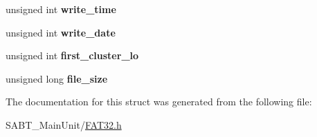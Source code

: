 \begin{DoxyCompactItemize}
\item 
\hypertarget{structdir___structure_a574ffb623d68fa48b2c90c6eead2dc12}{unsigned int {\bfseries write\-\_\-time}}\label{structdir___structure_a574ffb623d68fa48b2c90c6eead2dc12}

\item 
\hypertarget{structdir___structure_a3432b02a8e308c41d0887b5deda08f07}{unsigned int {\bfseries write\-\_\-date}}\label{structdir___structure_a3432b02a8e308c41d0887b5deda08f07}

\item 
\hypertarget{structdir___structure_a9cbf00e17f892dbda6e6fecbe964d472}{unsigned int {\bfseries first\-\_\-cluster\-\_\-lo}}\label{structdir___structure_a9cbf00e17f892dbda6e6fecbe964d472}

\item 
\hypertarget{structdir___structure_a72affc1cc3ea4453465c3976158285f8}{unsigned long {\bfseries file\-\_\-size}}\label{structdir___structure_a72affc1cc3ea4453465c3976158285f8}

\end{DoxyCompactItemize}


The documentation for this struct was generated from the following file\-:\begin{DoxyCompactItemize}
\item 
S\-A\-B\-T\-\_\-\-Main\-Unit/\hyperlink{_f_a_t32_8h}{F\-A\-T32.\-h}\end{DoxyCompactItemize}
